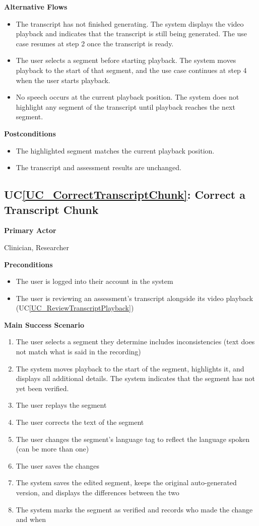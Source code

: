 \documentclass[12pt]{article}
\newcounter{ucnum} %
\newcommand{\ucref}[1]{UC\ref{#1}}
\begin{document}
\textbf{Alternative Flows}
\begin{itemize}
\item[2a.] The transcript has not finished generating. The system displays the video playback and indicates that the transcript is still being generated. The use case resumes at step 2 once the transcript is ready.
\item[3a.] The user selects a segment before starting playback. The system moves playback to the start of that segment, and the use case continues at step 4 when the user starts playback.
\item[4a.] No speech occurs at the current playback position. The system does not highlight any segment of the transcript until playback reaches the next segment.
\end{itemize}

\textbf{Postconditions}
\begin{itemize}
\item The highlighted segment matches the current playback position.
\item The transcript and assessment results are unchanged.
\end{itemize}

 \label{UC_CorrectTranscriptChunk}
\subsection{\ucref{UC_CorrectTranscriptChunk}: Correct a Transcript Chunk}

\textbf{Primary Actor}

Clinician, Researcher

\textbf{Preconditions}
\begin{itemize}
\item The user is logged into their account in the system
\item The user is reviewing an assessment’s transcript alongside its video playback (\ucref{UC_ReviewTranscriptPlayback})
\end{itemize}

\textbf{Main Success Scenario}
\begin{enumerate}
\item The user selects a segment they determine includes inconsistencies (text does not match what is said in the recording)
\item The system moves playback to the start of the segment, highlights it, and displays all additional details. The system indicates that the segment has not yet been verified.
\item The user replays the segment
\item The user corrects the text of the segment
\item The user changes the segment’s language tag to reflect the language spoken (can be more than one)
\item The user saves the changes
\item The system saves the edited segment, keeps the original auto-generated version, and displays the differences between the two
\item The system marks the segment as verified and records who made the change and when
\end{enumerate}
\end{document}
